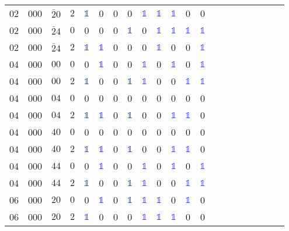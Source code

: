 \begin{longtable*}{c| cccccccccccccccccccc }
02& 000& $\bar{2}0$& $2$& \textcolor{blue}{$\mathds{1}$}& 0& 0& 0& \textcolor{blue}{$\mathds{1}$}& \textcolor{blue}{$\mathds{1}$}& \textcolor{blue}{$\mathds{1}$}& 0& 0\\
02& 000& $\bar{2}4$& $0$& 0& 0& 0& \textcolor{blue}{$\mathds{1}$}& 0& \textcolor{blue}{$\mathds{1}$}& \textcolor{blue}{$\mathds{1}$}& \textcolor{blue}{$\mathds{1}$}& \textcolor{blue}{$\mathds{1}$}\\
02& 000& $\bar{2}4$& $2$& \textcolor{blue}{$\mathds{1}$}& \textcolor{blue}{$\mathds{1}$}& 0& 0& 0& \textcolor{blue}{$\mathds{1}$}& 0& 0& \textcolor{blue}{$\mathds{1}$}\\
04& 000& $00$& $0$& 0& \textcolor{blue}{$\mathds{1}$}& 0& 0& \textcolor{blue}{$\mathds{1}$}& 0& \textcolor{blue}{$\mathds{1}$}& 0& \textcolor{blue}{$\mathds{1}$}\\
04& 000& $00$& $2$& \textcolor{blue}{$\mathds{1}$}& 0& 0& \textcolor{blue}{$\mathds{1}$}& \textcolor{blue}{$\mathds{1}$}& 0& 0& \textcolor{blue}{$\mathds{1}$}& \textcolor{blue}{$\mathds{1}$}\\
04& 000& $04$& $0$& 0& 0& 0& 0& 0& 0& 0& 0& 0\\
04& 000& $04$& $2$& \textcolor{blue}{$\mathds{1}$}& \textcolor{blue}{$\mathds{1}$}& 0& \textcolor{blue}{$\mathds{1}$}& 0& 0& \textcolor{blue}{$\mathds{1}$}& \textcolor{blue}{$\mathds{1}$}& 0\\
04& 000& $40$& $0$& 0& 0& 0& 0& 0& 0& 0& 0& 0\\
04& 000& $40$& $2$& \textcolor{blue}{$\mathds{1}$}& \textcolor{blue}{$\mathds{1}$}& 0& \textcolor{blue}{$\mathds{1}$}& 0& 0& \textcolor{blue}{$\mathds{1}$}& \textcolor{blue}{$\mathds{1}$}& 0\\
04& 000& $44$& $0$& 0& \textcolor{blue}{$\mathds{1}$}& 0& 0& \textcolor{blue}{$\mathds{1}$}& 0& \textcolor{blue}{$\mathds{1}$}& 0& \textcolor{blue}{$\mathds{1}$}\\
04& 000& $44$& $2$& \textcolor{blue}{$\mathds{1}$}& 0& 0& \textcolor{blue}{$\mathds{1}$}& \textcolor{blue}{$\mathds{1}$}& 0& 0& \textcolor{blue}{$\mathds{1}$}& \textcolor{blue}{$\mathds{1}$}\\
06& 000& $20$& $0$& 0& \textcolor{blue}{$\mathds{1}$}& 0& \textcolor{blue}{$\mathds{1}$}& \textcolor{blue}{$\mathds{1}$}& \textcolor{blue}{$\mathds{1}$}& 0& \textcolor{blue}{$\mathds{1}$}& 0\\
06& 000& $20$& $2$& \textcolor{blue}{$\mathds{1}$}& 0& 0& 0& \textcolor{blue}{$\mathds{1}$}& \textcolor{blue}{$\mathds{1}$}& \textcolor{blue}{$\mathds{1}$}& 0& 0\\

\end{longtable*}
